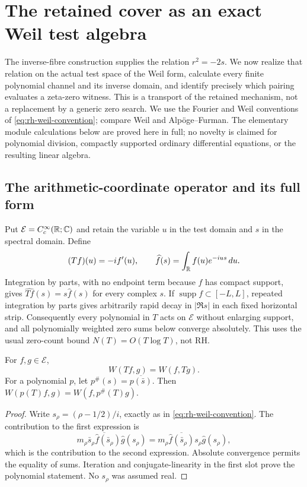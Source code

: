 \section{The retained cover as an exact Weil test algebra}
\label{sec:retained-weil-algebra}

The inverse-fibre construction supplies the relation $r^2=-2s$.
We now realize that relation on the actual test space of the Weil form,
calculate every finite polynomial channel and its inverse domain, and
identify precisely which pairing evaluates a zeta-zero witness. This is
a transport of the retained mechanism, not a replacement by a generic
zero search. We use the Fourier and Weil conventions of
\eqref{eq:rh-weil-convention}; compare Weil\cite{weil1952} and
Alp\"oge--Furman\cite[Sections 1.1--1.2 and 2]{alpogeFurman2026}.
The elementary module calculations below are proved here in full;
no novelty is claimed for polynomial division, compactly supported
ordinary differential equations, or the resulting linear algebra.

\subsection{The arithmetic-coordinate operator and its full form}
Put $\mathcal E=C_c^\infty(\mathbb R;\mathbb C)$ and retain the variable $u$ in
the test domain and $s$ in the spectral domain. Define
\[
 (Tf)(u)=-i f'(u),\qquad
 \widehat f(s)=\int_\mathbb R f(u)e^{-ius}\,du.
\]
Integration by parts, with no endpoint term because $f$ has compact
support, gives $\widehat{Tf}(s)=s\widehat f(s)$ for every complex $s$.
If $\operatorname{supp}f\subset[-L,L]$, repeated integration by parts
gives arbitrarily rapid decay in $|\Re s|$ in each fixed horizontal
strip. Consequently every polynomial in $T$ acts on $\mathcal E$
without enlarging support, and all polynomially weighted zero sums
below converge absolutely. This uses the usual zero-count bound
$N(T)=O(T\log T)$, not RH.

\begin{proposition}
For $f,g\in\mathcal E$,
\begin{equation}
 W(Tf,g)=W(f,Tg).
 \label{eq:retained-T-symmetric}
\end{equation}
For a polynomial $p$, let $p^\#(s)=\overline{p(\bar s)}$.
Then $W(p(T)f,g)=W(f,p^\#(T)g)$.
\end{proposition}
\begin{proof}
Write $s_\rho=(\rho-1/2)/i$, exactly as in
\eqref{eq:rh-weil-convention}. The contribution to the first expression is
\[
 m_\rho\overline{\bar s_\rho\widehat f(\bar s_\rho)}
                 \widehat g(s_\rho)
 =m_\rho\overline{\widehat f(\bar s_\rho)}
                 s_\rho\widehat g(s_\rho),
\]
which is the contribution to the second expression. Absolute convergence
permits the equality of sums. Iteration and conjugate-linearity in the
first slot prove the polynomial statement. No $s_\rho$ was assumed real.
\end{proof}


